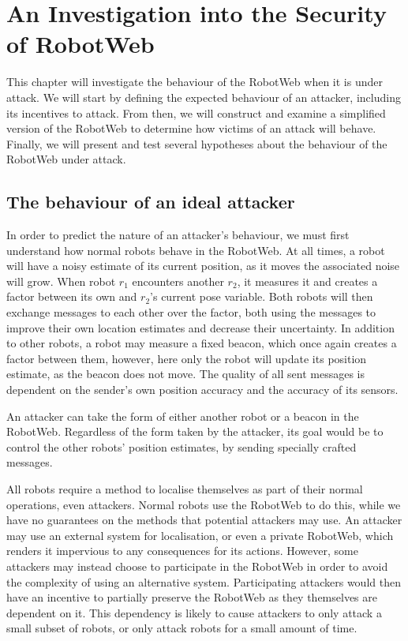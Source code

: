 \chapter{An Investigation into the Security of RobotWeb}
This chapter will investigate the behaviour of the RobotWeb when it is under attack. We will start by defining the expected behaviour of an attacker, including its incentives to attack. From then, we will construct and examine a simplified version of the RobotWeb to determine how victims of an attack will behave. Finally, we will present and test several hypotheses about the behaviour of the RobotWeb under attack.

\section{The behaviour of an ideal attacker}
In order to predict the nature of an attacker's behaviour, we must first understand how normal robots behave in the RobotWeb. At all times, a robot will have a noisy estimate of its current position, as it moves the associated noise will grow. When robot $r_1$ encounters another $r_2$, it measures it and creates a factor between its own and $r_2$'s current pose variable. Both robots will then exchange messages to each other over the factor, both using the messages to improve their own location estimates and decrease their uncertainty. In addition to other robots, a robot may measure a fixed beacon, which once again creates a factor between them, however, here only the robot will update its position estimate, as the beacon does not move. The quality of all sent messages is dependent on the sender's own position accuracy and the accuracy of its sensors.

An attacker can take the form of either another robot or a beacon in the RobotWeb. Regardless of the form taken by the attacker, its goal would be to control the other robots' position estimates, by sending specially crafted messages.

All robots require a method to localise themselves as part of their normal operations, even attackers. Normal robots use the RobotWeb to do this, while we have no guarantees on the methods that potential attackers may use. An attacker may use an external system for localisation, or even a private RobotWeb, which renders it impervious to any consequences for its actions. However, some attackers may instead choose to participate in the RobotWeb in order to avoid the complexity of using an alternative system. Participating attackers would then have an incentive to partially preserve the RobotWeb as they themselves are dependent on it. This dependency is likely to cause attackers to only attack a small subset of robots, or only attack robots for a small amount of time. 

